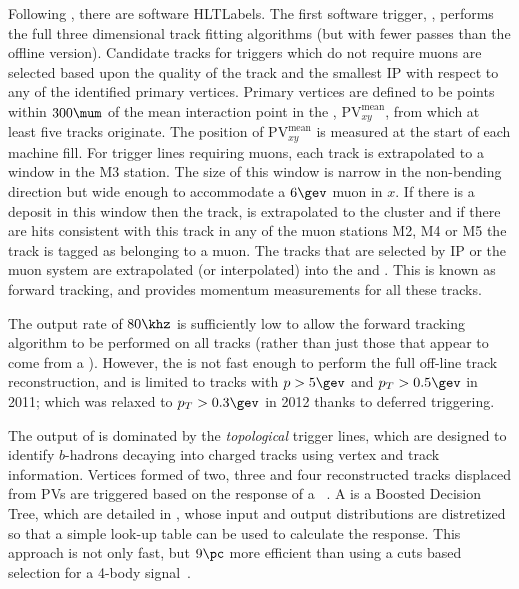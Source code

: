 Following \lone, there are software \glspl{HLTLabel}.
The first software trigger, \hltone, performs the full three dimensional \velo track fitting
algorithms (but with fewer passes than the offline version).
Candidate \velo tracks for triggers which do not require muons are selected based upon the quality of the
\velo track and the smallest IP with respect to any of the identified primary vertices.
Primary vertices are defined to be points within $300\mum$ of the mean
interaction point in the , $\mathrm{PV}^\mathrm{mean}_{xy}$, from which at least five
tracks originate.
The position of $\mathrm{PV}^\mathrm{mean}_{xy}$ is measured at the start of each \lhc machine
fill.
For trigger lines requiring muons, each \velo track is extrapolated to a window in the M3
station.
The size of this window is narrow in the non-bending direction but wide enough to accommodate a $6\gev$
muon in $x$.
If there is a deposit in this window then the \velo track, is extrapolated to the cluster and if
there are hits consistent with this track in any of the muon stations M2, M4 or M5 the track is
tagged as belonging to a muon.
The \velo tracks that are selected by IP or the muon system are extrapolated (or interpolated) into
the \intr and \ot.
This is known as forward tracking, and provides momentum measurements for all these tracks.


The \hltone output rate of $80\khz$ is sufficiently low to allow the forward tracking algorithm to
be performed on all \velo tracks (rather than just those that appear to come from a \pv).
However, the \hlttwo is not fast enough to perform the full off-line track reconstruction, and
is limited to \velo tracks with
$p>5\gev$ and $p_T>0.5\gev$ in 2011; which was relaxed to $p_T>0.3\gev$ in 2012 thanks to deferred
triggering.

The output of \hlttwo is dominated by the \emph{topological} trigger lines, which are designed to
identify $b$-hadrons decaying into charged tracks using vertex and track information.
Vertices formed of two, three and four reconstructed tracks displaced from PVs are triggered based
on the response of a \BBDT~\cite{Gligorov:2012qt}.
A \BBDT is a Boosted Decision Tree, which are detailed in , whose input and output
distributions are distretized so that a simple look-up table can be used to calculate the response.
This approach is not only fast, but $9\pc$ more efficient than using a cuts based selection for a
4-body signal~\cite{Gligorov:2012qt}.


